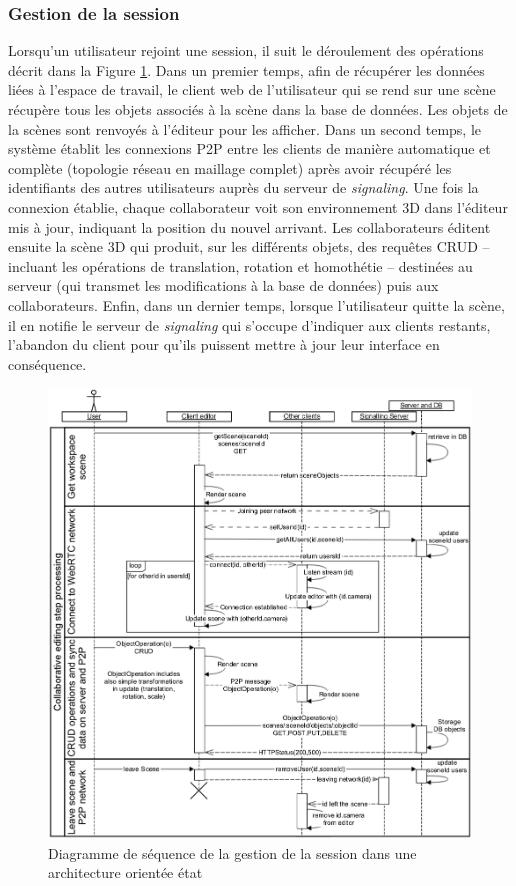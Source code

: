 \subsubsection{Gestion de la session}
Lorsqu'un utilisateur rejoint une session, il suit le déroulement des opérations 
décrit dans la Figure \ref{fig:sequence_state}. 
Dans un premier temps, afin de récupérer les données liées à l'espace de travail, 
le client web de l'utilisateur qui se rend sur une scène récupère 
tous les objets associés à la scène dans la base de données. Les objets de la 
scènes sont renvoyés à l'éditeur pour les afficher. 
Dans un second temps, le système établit les connexions \gls{P2P} entre les 
clients de manière automatique et complète (topologie réseau en maillage 
complet) après avoir récupéré les identifiants des autres utilisateurs auprès du 
serveur de \textit{signaling}. Une fois la connexion établie, chaque collaborateur 
voit son environnement \gls{3D} dans l'éditeur mis à jour, indiquant la position du 
nouvel 
arrivant. Les collaborateurs éditent ensuite la scène \gls{3D} qui produit, sur les 
différents objets, des requêtes \gls{CRUD} -- incluant les opérations de translation, 
rotation et homothétie -- destinées au serveur (qui transmet les 
modifications à la base de données) puis aux collaborateurs.
Enfin, dans un dernier temps, lorsque l'utilisateur quitte la scène, il en notifie le 
serveur de \textit{signaling} qui s'occupe d'indiquer aux clients restants, l'abandon 
du client pour qu'ils puissent mettre à jour leur interface en conséquence.

\begin{figure}[ht!]
	\centering
	\includegraphics[trim={0 0 0 3cm},clip,width=1\columnwidth]
	{eps/sequence_wscg.eps}
	\caption{Diagramme de séquence de la gestion de la session dans une 
	architecture \og orientée état\fg{}}
	\label{fig:sequence_state}
\end{figure}

